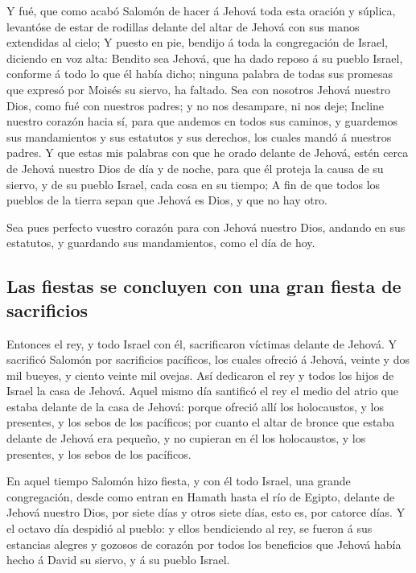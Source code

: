 Y fué, que como acabó Salomón de hacer á Jehová toda
esta oración y súplica, levantóse de estar de rodillas delante del altar
de Jehová con sus manos extendidas al cielo;  Y puesto en
pie, bendijo á toda la congregación de Israel, diciendo en voz alta:
 Bendito sea Jehová, que ha dado reposo á su pueblo
Israel, conforme á todo lo que él había dicho; ninguna palabra de todas
sus promesas que expresó por Moisés su siervo, ha faltado.
 Sea con nosotros Jehová nuestro Dios, como fué con
nuestros padres; y no nos desampare, ni nos deje; 
Incline nuestro corazón hacia sí, para que andemos en todos sus caminos,
y guardemos sus mandamientos y sus estatutos y sus derechos, los cuales
mandó á nuestros padres.  Y que estas mis palabras con
que he orado delante de Jehová, estén cerca de Jehová nuestro Dios de
día y de noche, para que él proteja la causa de su siervo, y de su
pueblo Israel, cada cosa en su tiempo;  A fin de que
todos los pueblos de la tierra sepan que Jehová es Dios, y que no hay
otro.

 Sea pues perfecto vuestro corazón para con Jehová
nuestro Dios, andando en sus estatutos, y guardando sus mandamientos,
como el día de hoy.

\hypertarget{las-fiestas-se-concluyen-con-una-gran-fiesta-de-sacrificios}{%
\subsection{Las fiestas se concluyen con una gran fiesta de
sacrificios}\label{las-fiestas-se-concluyen-con-una-gran-fiesta-de-sacrificios}}

 Entonces el rey, y todo Israel con él, sacrificaron
víctimas delante de Jehová.  Y sacrificó Salomón por
sacrificios pacíficos, los cuales ofreció á Jehová, veinte y dos mil
bueyes, y ciento veinte mil ovejas. Así dedicaron el rey y todos los
hijos de Israel la casa de Jehová.  Aquel mismo día
santificó el rey el medio del atrio que estaba delante de la casa de
Jehová: porque ofreció allí los holocaustos, y los presentes, y los
sebos de los pacíficos; por cuanto el altar de bronce que estaba delante
de Jehová era pequeño, y no cupieran en él los holocaustos, y los
presentes, y los sebos de los pacíficos.

 En aquel tiempo Salomón hizo fiesta, y con él todo
Israel, una grande congregación, desde como entran en Hamath hasta el
río de Egipto, delante de Jehová nuestro Dios, por siete días y otros
siete días, esto es, por catorce días.  Y el octavo día
despidió al pueblo: y ellos bendiciendo al rey, se fueron á sus
estancias alegres y gozosos de corazón por todos los beneficios que
Jehová había hecho á David su siervo, y á su pueblo Israel.

